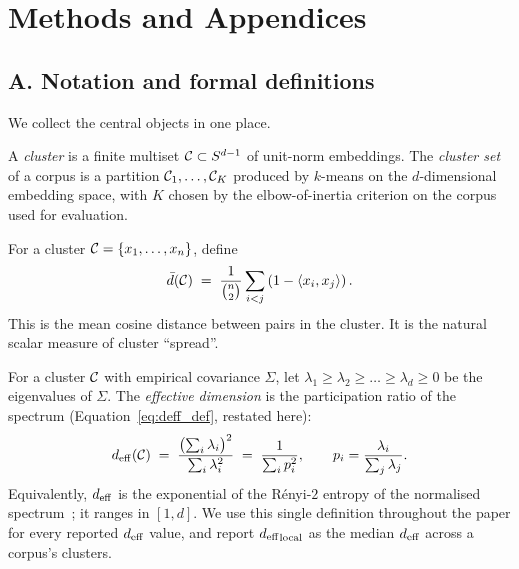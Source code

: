 \section{Methods and Appendices}
\label{sec:methods}

\subsection*{A. Notation and formal definitions}
\label{sec:methods:notation}

We collect the central objects in one place.

\begin{definition}
A \emph{cluster} is a finite multiset $\mathcal{C} \subset S^{d-1}$
of unit-norm embeddings. The \emph{cluster set} of a corpus is a
partition $\mathcal{C}_1, \ldots, \mathcal{C}_K$ produced by $k$-means
on the $d$-dimensional embedding space, with $K$ chosen by the
elbow-of-inertia criterion on the corpus used for evaluation.
\end{definition}

\begin{definition}
For a cluster $\mathcal{C} = \{x_1, \ldots, x_n\}$, define
\[
\bar{d}(\mathcal{C}) \;=\; \frac{1}{\binom{n}{2}} \sum_{i<j}
\left(1 - \left\langle x_i,x_j\right\rangle\right).
\]
This is the mean cosine distance between pairs in the cluster.
It is the natural scalar measure of cluster ``spread''.
\end{definition}

\begin{definition}
\label{def:deff}
For a cluster $\mathcal{C}$ with empirical covariance $\Sigma$,
let $\lambda_1 \geq \lambda_2 \geq \ldots \geq \lambda_d \geq 0$
be the eigenvalues of $\Sigma$. The \emph{effective dimension} is
the participation ratio of the spectrum
(Equation~\eqref{eq:deff_def}, restated here):
\[
{d_{\mathrm{eff}}}(\mathcal{C}) \;=\; \frac{\bigl(\sum_i \lambda_i\bigr)^{2}}{\sum_i \lambda_i^{2}}
\;=\; \frac{1}{\sum_i p_i^{2}}, \qquad
p_i = \frac{\lambda_i}{\sum_j \lambda_j}.
\]
Equivalently, ${d_{\mathrm{eff}}}$ is the exponential of the R\'enyi-$2$
entropy of the normalised spectrum~\cite{royVetterli2007}; it
ranges in $[1, d]$. We use this single definition throughout the
paper for every reported ${d_{\mathrm{eff}}}$ value, and report
${d_{\mathrm{eff}}}_{\mathrm{local}}$ as the median ${d_{\mathrm{eff}}}$ across a corpus's
clusters.
\end{definition}

